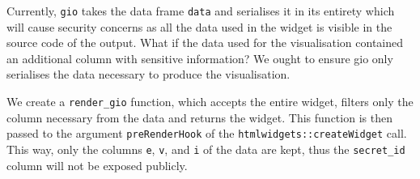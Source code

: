 \documentclass[10pt,]{krantz}
\makeatletter
\newenvironment{Shaded}{\begin{snugshade}}{\end{snugshade}}
\newcommand{\CommentTok}[1]{\textcolor[rgb]{0.37,0.37,0.37}{\textit{#1}}}
\newcommand{\ControlFlowTok}[1]{\textcolor[rgb]{0.27,0.27,0.27}{\textbf{#1}}}
\newcommand{\DataTypeTok}[1]{\textcolor[rgb]{0.27,0.27,0.27}{#1}}
\newcommand{\DecValTok}[1]{\textcolor[rgb]{0.06,0.06,0.06}{#1}}
\newcommand{\KeywordTok}[1]{\textcolor[rgb]{0.27,0.27,0.27}{\textbf{#1}}}
\newcommand{\NormalTok}[1]{#1}
\newcommand{\OperatorTok}[1]{\textcolor[rgb]{0.43,0.43,0.43}{\textbf{#1}}}
\newcommand{\OtherTok}[1]{\textcolor[rgb]{0.37,0.37,0.37}{#1}}
\newcommand{\StringTok}[1]{\textcolor[rgb]{0.5,0.5,0.5}{#1}}
\newenvironment{kframe}{%
\medskip{}
\setlength{\fboxsep}{.8em}
 \def\at@end@of@kframe{}%
 \ifinner\ifhmode%
  \def\at@end@of@kframe{\end{minipage}}%
  \begin{minipage}{\columnwidth}%
 \fi\fi%
 \def\FrameCommand##1{\hskip\@totalleftmargin \hskip-\fboxsep
 \colorbox{shadecolor}{##1}\hskip-\fboxsep
     \hskip-\linewidth \hskip-\@totalleftmargin \hskip\columnwidth}%
 \MakeFramed {\advance\hsize-\width
   \@totalleftmargin\z@ \linewidth\hsize
   \@setminipage}}%
 {\par\unskip\endMakeFramed%
 \at@end@of@kframe}
\renewenvironment{Shaded}{\begin{kframe}}{\end{kframe}}
\makeatother
\begin{document}
Currently, \texttt{gio} takes the data frame \texttt{data} and serialises it in its entirety which will cause security concerns as all the data used in the widget is visible in the source code of the output. What if the data used for the visualisation contained an additional column with sensitive information? We ought to ensure gio only serialises the data necessary to produce the visualisation.

\begin{Shaded}
\end{Shaded}

We create a \texttt{render\_gio} function, which accepts the entire widget, filters only the column necessary from the data and returns the widget. This function is then passed to the argument \texttt{preRenderHook} of the \texttt{htmlwidgets::createWidget} call. This way, only the columns \texttt{e}, \texttt{v}, and \texttt{i} of the data are kept, thus the \texttt{secret\_id} column will not be exposed publicly.

\begin{Shaded}
\end{Shaded}
\end{document}
